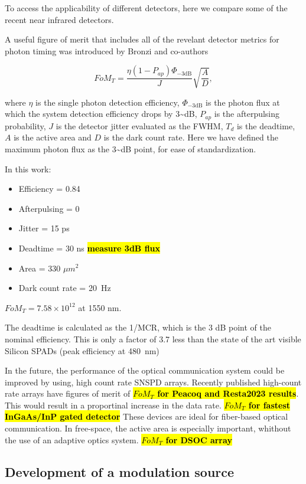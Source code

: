 \documentclass{optica-article}
\providecommand{\tightlist}{%
  \setlength{\itemsep}{0pt}\setlength{\parskip}{0pt}}
\begin{document}
To access the applicability of different detectors, here we compare some of the recent near infrared detectors.

A useful figure of merit that includes all of the revelant detector metrics for photon timing was introduced by Bronzi and co-authors \cite{Bronzi2016}

$$FoM_T = \frac{\eta  (1 - P_{ap})\Phi_{-3 \text{dB}}}{J} \sqrt{\frac{A}{D}},$$

where $\eta$ is the single photon detection efficiency, $\Phi_{-3 \text{dB}}$ is the photon flux at which the system detection efficiency drops by 3\textasciitilde dB, $P_{ap}$ is the afterpulsing probability, $J$ is the detector jitter evaluated as the FWHM, $T_d$ is the deadtime, $A$ is the active area and $D$ is the dark count rate. Here we have defined the maximum photon flux as the 3\textasciitilde dB point, for ease of standardization.

In this work:

\begin{itemize}
\tightlist
\item
  Efficiency = 0.84
\item
  Afterpulsing = 0 %
\item
  Jitter = 15 ps
\item
  Deadtime = 30 ns \textbf{\hl{measure 3dB flux}}
\item
  Area = 330 $\mu m^2$
\item
  Dark count rate = 20~Hz
\end{itemize}

$FoM_T = 7.58 \times 10^{12}$ at 1550 nm.

The deadtime is calculated as the 1/MCR, which is the 3 dB point of the nominal efficiency. This is only a factor of 3.7 less than the state of the art visible Silicon SPADs (peak efficiency at 480~nm) \cite{Gramuglia2022}

In the future, the performance of the optical communication system could be improved by using, high count rate SNSPD arrays. Recently published high-count rate arrays have figures of merit of \textbf{\hl{$FoM_T$ for Peacoq and Resta2023 results}}. This would result in a proportinal increase in the data rate.
\textbf{\hl{$FoM_T$ for fastest InGaAs/InP gated detector}}
These devices are ideal for fiber-based optical communication. In free-space, the active area is especially important, whithout the use of an adaptive optics system.
\textbf{\hl{$FoM_T$ for DSOC array}}

\hypertarget{development-of-a-modulation-source}{%
\subsection{Development of a modulation source}\label{development-of-a-modulation-source}}
\end{document}
